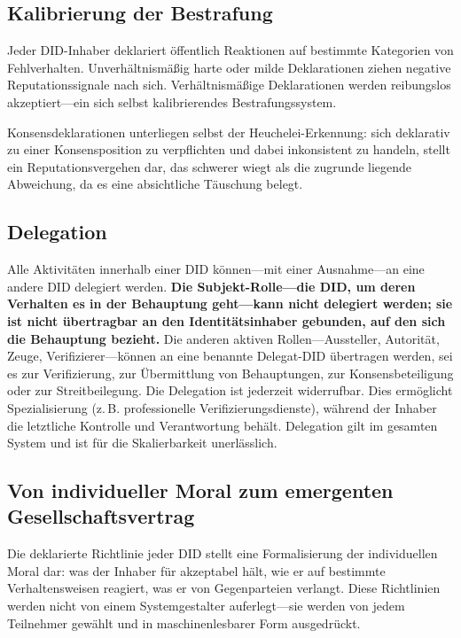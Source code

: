 \documentclass[11pt,a4paper,twocolumn]{article}
\begin{document}
\subsection{Kalibrierung der Bestrafung}

Jeder DID-Inhaber deklariert öffentlich Reaktionen auf bestimmte Kategorien von Fehlverhalten. Unverhältnismäßig harte oder milde Deklarationen ziehen negative Reputationssignale nach sich. Verhältnismäßige Deklarationen werden reibungslos akzeptiert---ein sich selbst kalibrierendes Bestrafungssystem.

Konsensdeklarationen unterliegen selbst der Heuchelei-Erkennung: sich deklarativ zu einer Konsensposition zu verpflichten und dabei inkonsistent zu handeln, stellt ein Reputationsvergehen dar, das schwerer wiegt als die zugrunde liegende Abweichung, da es eine absichtliche Täuschung belegt.

\subsection{Delegation}

Alle Aktivitäten innerhalb einer DID können---mit einer Ausnahme---an eine andere DID delegiert werden. \textbf{Die Subjekt-Rolle---die DID, um deren Verhalten es in der Behauptung geht---kann nicht delegiert werden; sie ist nicht übertragbar an den Identitätsinhaber gebunden, auf den sich die Behauptung bezieht.} Die anderen aktiven Rollen---Aussteller, Autorität, Zeuge, Verifizierer---können an eine benannte Delegat-DID übertragen werden, sei es zur Verifizierung, zur Übermittlung von Behauptungen, zur Konsensbeteiligung oder zur Streitbeilegung. Die Delegation ist jederzeit widerrufbar. Dies ermöglicht Spezialisierung (z.\,B. professionelle Verifizierungsdienste), während der Inhaber die letztliche Kontrolle und Verantwortung behält. Delegation gilt im gesamten System und ist für die Skalierbarkeit unerlässlich.

\subsection{Von individueller Moral zum emergenten Gesellschaftsvertrag}

Die deklarierte Richtlinie jeder DID stellt eine Formalisierung der individuellen Moral dar: was der Inhaber für akzeptabel hält, wie er auf bestimmte Verhaltensweisen reagiert, was er von Gegenparteien verlangt. Diese Richtlinien werden nicht von einem Systemgestalter auferlegt---sie werden von jedem Teilnehmer gewählt und in maschinenlesbarer Form ausgedrückt.
\end{document}
